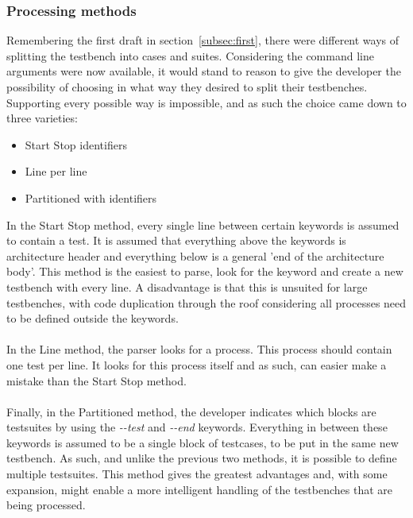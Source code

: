 \documentclass[11pt,british]{article}
\begin{document}
\subsubsection{Processing methods}
\label{subsubsec:processmethods}
Remembering the first draft in section~\ref{subsec:first}, there were different ways of splitting the testbench into cases and suites. Considering the command line arguments were now available, it would stand to reason to give the developer the possibility of choosing in what way they desired to split their testbenches. Supporting every possible way is impossible, and as such the choice came down to three varieties:
\begin{itemize}[itemsep=-0.1cm]
\item Start Stop identifiers
\item Line per line 
\item Partitioned with identifiers
\end{itemize}
In the Start Stop method, every single line between certain keywords is assumed to contain a test. It is assumed that everything above the keywords is architecture header and everything below is a general 'end of the architecture body'. This method is the easiest to parse, look for the keyword and create a new testbench with every line. A disadvantage is that this is unsuited for large testbenches, with code duplication through the roof considering all processes need to be defined outside the keywords.\\
\\
In the Line method, the parser looks for a process. This process should contain one test per line. It looks for this process itself and as such, can easier make a mistake than the Start Stop method.\\
\\
Finally, in the Partitioned method, the developer indicates which blocks are testsuites by using the \emph{-\--test} and \emph{-\--end} keywords. Everything in between these keywords is assumed to be a single block of testcases, to be put in the same new testbench. As such, and unlike the previous two methods, it is possible to define multiple testsuites. This method gives the greatest advantages and, with some expansion, might enable a more intelligent handling of the testbenches that are being processed.
\end{document}
